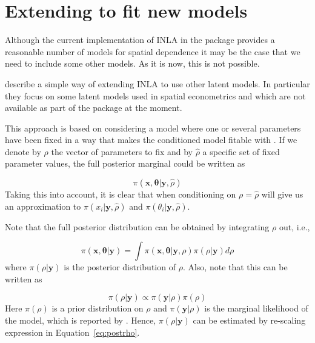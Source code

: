 \documentclass[article]{jss}
\begin{document}
\section[Extending {R-INLA} to fit new models]{Extending  to fit new models} 

\label{sec:extINLA}


Although the current implementation of INLA in the  package
provides a reasonable number of models for spatial dependence it may be the
case that we need to include some other models. As it is now, this is not
possible.

\citet{Bivandetal:2013} describe a simple way of extending INLA to use other
latent models.  In particular they focus on some latent models used in spatial
econometrics and which are not available as part of the  package at
the moment.

This approach is based on considering a model where one or several parameters have been
fixed in a way that makes the conditioned model fitable with .  If
we denote by $\rho$ the vector of parameters to fix and by $\hat{\rho}$ a
specific set of fixed parameter values,  the full posterior marginal could be
written as


\begin{equation}
\pi(\mathbf{x}, \mathbf{\theta}|\mathbf{y}, \hat{\rho}) 
\end{equation}
\noindent
Taking this into account,  it is clear that when conditioning on
$\rho=\hat\rho$  will give us an approximation to
$\pi(x_i|\mathbf{y}, \hat{\rho})$ and $\pi(\theta_i|\mathbf{y}, \hat{\rho})$.



Note that the full posterior distribution can be obtained by integrating $\rho$
out, i.e.,

\begin{equation}
\pi(\mathbf{x}, \mathbf{\theta}|\mathbf{y}) = 
\int \pi(\mathbf{x}, \mathbf{\theta}|\mathbf{y}, \rho)\pi(\rho|\mathbf{y})d\rho
\label{eq:fullpost}
\end{equation}
\noindent
where $\pi(\rho|\mathbf{y})$ is the posterior distribution of $\rho$. Also,
note that this can be written as

\begin{equation}
\pi(\rho|\mathbf{y}) \propto \pi(\mathbf{y}|\rho) \pi(\rho)
\label{eq:postrho}
\end{equation}
\noindent
Here $\pi(\rho)$ is a prior distribution on $\rho$ and $\pi(\mathbf{y}|\rho)$
is the marginal likelihood of the model, which is reported by .
Hence, $\pi(\rho|\mathbf{y})$ can be estimated by re-scaling
expression in Equation~\ref{eq:postrho}.
\end{document}
